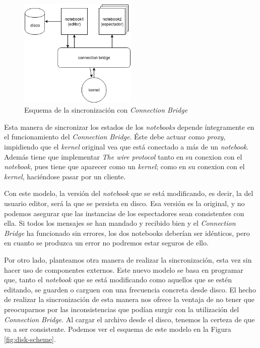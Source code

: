 \documentclass[11pt,spanish,listoffigures,listoftables]{tfgetsinf}
\begin{document}
\begin{figure}[h]
	\centering
  	\includegraphics[width=0.5\textwidth]{Connection_Bridge.png}
  	\caption{Esquema de la sincronización con \textit{Connection Bridge}}
  	\label{fig:cb-scheme}
\end{figure}

Esta manera de sincronizar los estados de los \textit{notebooks} depende íntegramente en el funcionamiento del \textit{Connection Bridge}. Éste debe actuar como \textit{proxy}, impidiendo que el \textit{kernel} original vea que está conectado a más de un \textit{notebook}. Además tiene que implementar \textit{The wire protocol} \cite{wire-protocol} tanto en su conexion con el \textit{notebook}, pues tiene que aparecer como un \textit{kernel}; como en su conexion con el \textit{kernel}, haciéndose pasar por un cliente. 

Con este modelo, la versión del \textit{notebook} que se está modificando, es decir, la del usuario editor, será la que se persista en disco. Esa versión es la original, y no podemos asegurar que las instancias de los espectadores sean consistentes con ella. Si todos los mensajes se han mandado y recibido bien y el \textit{Connection Bridge} ha funcionado sin errores, los dos notebooks deberían ser idénticos, pero en cuanto se produzca un error no podremos estar seguros de ello.

Por otro lado, planteamos otra manera de realizar la sincronización, esta vez sin hacer uso de componentes externos. Este nuevo modelo se basa en programar que, tanto el \textit{notebook} que se está modificando como aquellos que se estén editando, se guarden o carguen con una frecuencia concreta desde disco. El hecho de realizar la sincronización de esta manera nos ofrece la ventaja de no tener que preocuparnos por las inconsistencias que podían surgir con la utilización del \textit{Connection Bridge}. Al cargar el archivo desde el disco, tenemos la certeza de que va a ser consistente. Podemos ver el esquema de este modelo en la Figura \ref{fig:disk-scheme}.
\end{document}
